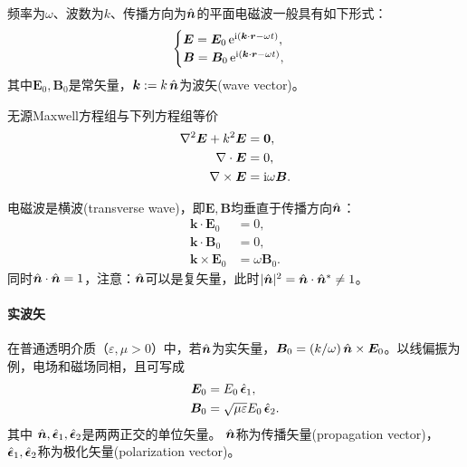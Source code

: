 频率为$\omega$、波数为$k$、传播方向为$\mathop{}\!\hat{\bm{n}}$的平面电磁波一般具有如下形式：
\begin{equation}
    \begin{cases}
        \bm E = \bm E_0\mathop{}\!\mathrm{e}^{\mathrm{i}(\bm k\cdot\bm r-\omega t)},\\
        \bm B = \bm B_0\mathop{}\!\mathrm{e}^{\mathrm{i}(\bm k\cdot\bm r-\omega t)},
    \end{cases}
\end{equation}
其中$\bm E_0,\bm B_0$是常矢量，$\bm k := k\mathop{}\!\hat{\bm{n}}$为波矢(wave vector)。
\begin{theorem}{}{}
    无源Maxwell方程组与下列方程组等价
    \begin{subequations}
        \begin{align}
            \nabla^2\bm E + k^2\bm E &= \bm 0,\\
            \nabla\cdot\bm E &= 0,\\
            \nabla\times\bm E &= \mathrm{i}\omega\bm B.
        \end{align}
    \end{subequations}
\end{theorem}
\begin{corollary}
    电磁波是横波(transverse wave)，即$\bm E,\bm B$均垂直于传播方向$\mathop{}\!\hat{\bm{n}}$：
    \begin{subequations}
        \label{eqn:transverse}
        \begin{align}
            \bm k \cdot \bm E_0 &= 0,\\
            \bm k \cdot \bm B_0 &= 0,\\
            \bm k \times \bm E_0 &= \omega\bm B_0.
        \end{align}
    \end{subequations}
    同时$\mathop{}\!\hat{\bm{n}} \cdot \mathop{}\!\hat{\bm{n}} = 1$，注意：$\mathop{}\!\hat{\bm{n}}$可以是复矢量，此时$\lvert\mathop{}\!\hat{\bm{n}}\rvert^2 = \mathop{}\!\hat{\bm{n}} \cdot \mathop{}\!\hat{\bm{n}}^* \neq 1$。
\end{corollary}

\paragraph{实波矢}

在普通透明介质（$\varepsilon,\mu > 0$）中，若$\mathop{}\!\hat{\bm{n}}$为实矢量，$\bm B_0 = (k/\omega)\mathop{}\!\hat{\bm{n}} \times \bm E_0$。以线偏振为例，电场和磁场同相，且可写成
\begin{subequations}
    \begin{align}
        \bm E_0 &= E_0\mathop{}\!\hat{\bm{\epsilon}}_1,\\
        \bm B_0 &= \sqrt{\mu\varepsilon}E_0\mathop{}\!\hat{\bm{\epsilon}}_2.
    \end{align}
\end{subequations}
其中
$\mathop{}\!\hat{\bm{n}},\mathop{}\!\hat{\bm{\epsilon}}_1,\mathop{}\!\hat{\bm{\epsilon}}_2$是两两正交的单位矢量。
$\mathop{}\!\hat{\bm{n}}$称为传播矢量(propagation vector)，
$\mathop{}\!\hat{\bm{\epsilon}}_1,\mathop{}\!\hat{\bm{\epsilon}}_2$称为极化矢量(polarization vector)。

